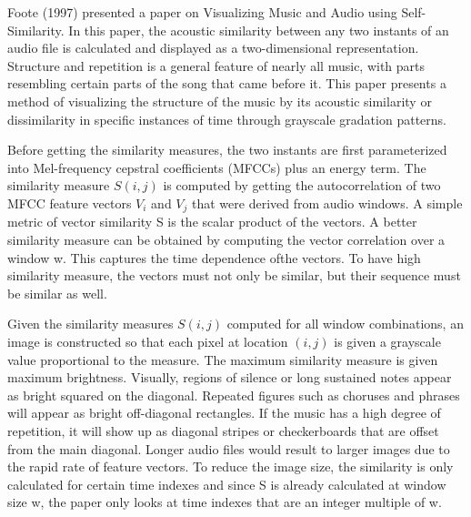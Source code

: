 	Foote (1997) presented a paper on Visualizing Music and Audio using Self-Similarity. In this paper, the acoustic similarity between any two instants of an audio file is calculated and displayed as a two-dimensional representation. Structure and repetition is a general feature of nearly all music, with parts resembling certain parts of the song that came before it. This paper presents a method of visualizing the structure of the music by its acoustic similarity or dissimilarity in specific instances of time through grayscale gradation patterns. 
	
	Before getting the similarity measures, the two instants  are first parameterized into Mel-frequency cepstral coefficients (MFCCs) plus an energy term. The similarity measure $S(i,j)$ is computed by getting the autocorrelation of two MFCC feature vectors $V_i$ and $V_j$ that were derived from audio windows. A simple metric of vector similarity S is the scalar product of the vectors. A better similarity measure can be obtained by computing the vector correlation over a window w. This captures the time dependence ofthe vectors. To have high similarity measure, the vectors must not only be similar, but their sequence must be similar as well. 

	Given the similarity measures $S(i,j)$ computed for all window combinations, an image is constructed so that each pixel at location $(i,j)$ is given a grayscale value proportional to the measure. The maximum similarity measure is given maximum brightness. Visually, regions of silence or long sustained notes appear as bright squared on the diagonal. Repeated figures such as choruses and phrases will appear as bright off-diagonal rectangles. If the music has a high degree of repetition, it will show up as diagonal stripes or checkerboards that are offset from the main diagonal. Longer audio files would result to larger images due to the rapid rate of feature vectors. To reduce the image size, the similarity is only calculated for certain time indexes and since S is already calculated at window size w, the paper only looks at time indexes that are an integer multiple of w.